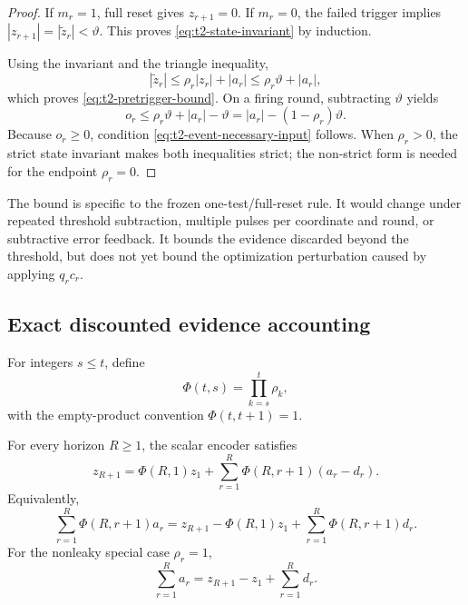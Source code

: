\begin{proof}
If $m_r=1$, full reset gives $z_{r+1}=0$. If $m_r=0$, the failed trigger implies $|z_{r+1}|=|\widetilde z_r|<\vartheta$. This proves \eqref{eq:t2-state-invariant} by induction.

Using the invariant and the triangle inequality,
\begin{equation}
    |\widetilde z_r|
    \leq
    \rho_r|z_r|+|a_r|
    \leq
    \rho_r\vartheta+|a_r|,
\end{equation}
which proves \eqref{eq:t2-pretrigger-bound}. On a firing round, subtracting $\vartheta$ yields
\begin{equation}
    o_r
    \leq
    \rho_r\vartheta+|a_r|-\vartheta
    =
    |a_r|-(1-\rho_r)\vartheta.
\end{equation}
Because $o_r\geq0$, condition \eqref{eq:t2-event-necessary-input} follows. When $\rho_r>0$, the strict state invariant makes both inequalities strict; the non-strict form is needed for the endpoint $\rho_r=0$.
\end{proof}

\begin{remark}
The bound is specific to the frozen one-test/full-reset rule. It would change under repeated threshold subtraction, multiple pulses per coordinate and round, or subtractive error feedback. It bounds the evidence discarded beyond the threshold, but does not yet bound the optimization perturbation caused by applying $q_r c_r$.
\end{remark}

\subsection{Exact discounted evidence accounting}

For integers $s\leq t$, define
\begin{equation}
    \Phi(t,s)=\prod_{k=s}^{t}\rho_k,
\end{equation}
with the empty-product convention $\Phi(t,t+1)=1$.

\begin{proposition}
\label{prop:t2-discounted-identity}
For every horizon $R\geq1$, the scalar encoder satisfies
\begin{equation}
    z_{R+1}
    =
    \Phi(R,1)z_1
    +
    \sum_{r=1}^{R}
    \Phi(R,r+1)(a_r-d_r).
    \label{eq:t2-discounted-identity}
\end{equation}
Equivalently,
\begin{equation}
    \sum_{r=1}^{R}\Phi(R,r+1)a_r
    =
    z_{R+1}
    -
    \Phi(R,1)z_1
    +
    \sum_{r=1}^{R}\Phi(R,r+1)d_r.
    \label{eq:t2-discounted-balance}
\end{equation}
For the nonleaky special case $\rho_r=1$,
\begin{equation}
    \sum_{r=1}^{R}a_r
    =
    z_{R+1}-z_1+\sum_{r=1}^{R}d_r.
    \label{eq:t2-nonleaky-balance}
\end{equation}
\end{proposition}

